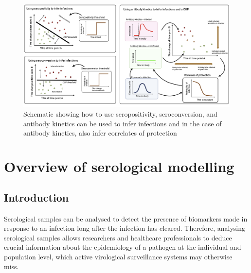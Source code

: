 \begin{figure}[H]
    \centering
    \includegraphics[width=1\textwidth]{sections/s1_intro/figs/sch_A.png}  \caption{Schematic showing how to use seropositivity, seroconversion, and antibody kinetics can be used to infer infections and in the case of antibody kinetics, also infer correlates of protection    \label{fig:sch_A}}
\end{figure}


\section{Overview of serological modelling}
\subsection{Introduction}

\paragraph{}Serological samples can be analysed to detect the presence of biomarkers made in response to an infection long after the infection has cleared.\cite{Cutts2016-za} Therefore, analysing serological samples allows researchers and healthcare professionals to deduce crucial information about the epidemiology of a pathogen at the individual and population level, which active virological surveillance systems may otherwise miss.


